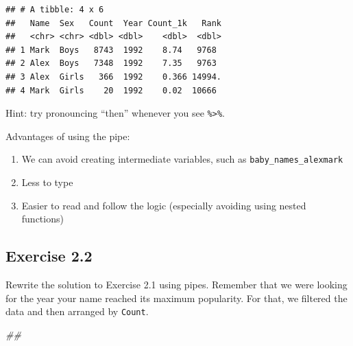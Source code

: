 \documentclass[]{book}
\newenvironment{Shaded}{\begin{snugshade}}{\end{snugshade}}
\newcommand{\CommentTok}[1]{\textcolor[rgb]{0.56,0.35,0.01}{\textit{#1}}}
\newcommand{\KeywordTok}[1]{\textcolor[rgb]{0.13,0.29,0.53}{\textbf{#1}}}
\newcommand{\NormalTok}[1]{#1}
\newcommand{\OperatorTok}[1]{\textcolor[rgb]{0.81,0.36,0.00}{\textbf{#1}}}
\newcommand{\StringTok}[1]{\textcolor[rgb]{0.31,0.60,0.02}{#1}}
\providecommand{\tightlist}{%
  \setlength{\itemsep}{0pt}\setlength{\parskip}{0pt}}
\begin{document}
\begin{verbatim}
## # A tibble: 4 x 6
##   Name  Sex   Count  Year Count_1k   Rank
##   <chr> <chr> <dbl> <dbl>    <dbl>  <dbl>
## 1 Mark  Boys   8743  1992    8.74   9768 
## 2 Alex  Boys   7348  1992    7.35   9763 
## 3 Alex  Girls   366  1992    0.366 14994.
## 4 Mark  Girls    20  1992    0.02  10666
\end{verbatim}

Hint: try pronouncing ``then'' whenever you see \texttt{\%\textgreater{}\%}.

\begin{Shaded}
\end{Shaded}

Advantages of using the pipe:

\begin{enumerate}
\def\labelenumi{\arabic{enumi}.}
\tightlist
\item
  We can avoid creating intermediate variables, such as \texttt{baby\_names\_alexmark}
\item
  Less to type
\item
  Easier to read and follow the logic (especially avoiding using nested functions)
\end{enumerate}

\hypertarget{exercise-2.2}{%
\subsection{Exercise 2.2}\label{exercise-2.2}}

Rewrite the solution to Exercise 2.1 using pipes. Remember that we were looking
for the year your name reached its maximum popularity. For that, we filtered
the data and then arranged by \texttt{Count}.

\begin{Shaded}
\begin{Highlighting}[]
\CommentTok{##}
\end{Highlighting}
\end{Shaded}
\end{document}
